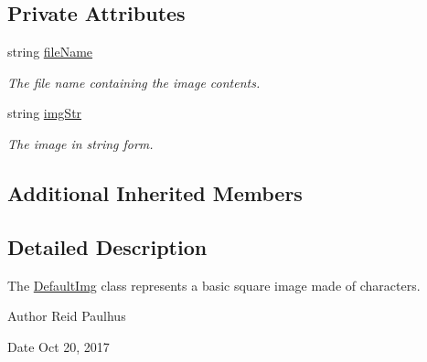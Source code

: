 \subsection*{Private Attributes}
\begin{DoxyCompactItemize}
\item 
string \hyperlink{classImportImg_a153117d9186b4d7317259ea9dd4c47b1}{file\-Name}
\begin{DoxyCompactList}\small\item\em The file name containing the image contents. \end{DoxyCompactList}\item 
string \hyperlink{classImportImg_a3529487bc41c4ae9a7926b09aec05305}{img\-Str}
\begin{DoxyCompactList}\small\item\em The image in string form. \end{DoxyCompactList}\end{DoxyCompactItemize}
\subsection*{Additional Inherited Members}


\subsection{Detailed Description}
The \hyperlink{classDefaultImg}{Default\-Img} class represents a basic square image made of characters. 

\begin{DoxyAuthor}{Author}
Reid Paulhus 
\end{DoxyAuthor}
\begin{DoxyDate}{Date}
Oct 20, 2017 
\end{DoxyDate}


